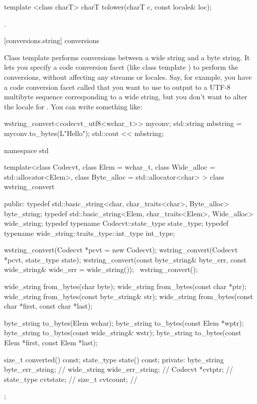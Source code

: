 %
\begin{itemdecl}
template <class charT> charT tolower(charT c, const locale& loc);
\end{itemdecl}

\begin{itemdescr}
\pnum
\returns
{}.
\end{itemdescr}

[conversions.string]{ conversions}

\pnum
Class template  performs conversions between a wide
string and a byte string. It lets you specify a code conversion facet
(like class template ) to perform the conversions, without
affecting any streams or locales. \enterexample Say, for example, you have a code
conversion facet called  that you want to use to output to
 a UTF-8 multibyte sequence corresponding to a wide string, but you
don't want to alter the locale for . You can write something like:

\begin{codeblock}
wstring_convert<codecvt_utf8<wchar_t>> myconv;
std::string mbstring = myconv.to_bytes(L"Hello\n");
std::cout << mbstring;
\end{codeblock}
\exitexample

\pnum
{}

%
\begin{codeblock}
namespace std {
template<class Codecvt, class Elem = wchar_t,
    class Wide_alloc = std::allocator<Elem>,
    class Byte_alloc = std::allocator<char> > class wstring_convert {
  public:
    typedef std::basic_string<char, char_traits<char>, Byte_alloc> byte_string;
    typedef std::basic_string<Elem, char_traits<Elem>, Wide_alloc> wide_string;
    typedef typename Codecvt::state_type state_type;
    typedef typename wide_string::traits_type::int_type int_type;

    wstring_convert(Codecvt *pcvt = new Codecvt);
    wstring_convert(Codecvt *pcvt, state_type state);
    wstring_convert(const byte_string& byte_err,
                    const wide_string& wide_err = wide_string());
    ~wstring_convert();

    wide_string from_bytes(char byte);
    wide_string from_bytes(const char *ptr);
    wide_string from_bytes(const byte_string& str);
    wide_string from_bytes(const char *first, const char *last);

    byte_string to_bytes(Elem wchar);
    byte_string to_bytes(const Elem *wptr);
    byte_string to_bytes(const wide_string& wstr);
    byte_string to_bytes(const Elem *first, const Elem *last);

    size_t converted() const;
    state_type state() const;
  private:
    byte_string byte_err_string;    // \expos
    wide_string wide_err_string;    // \expos
    Codecvt *cvtptr;                // \expos
    state_type cvtstate;            // \expos
    size_t cvtcount;                // \expos
  };
}
\end{codeblock}

